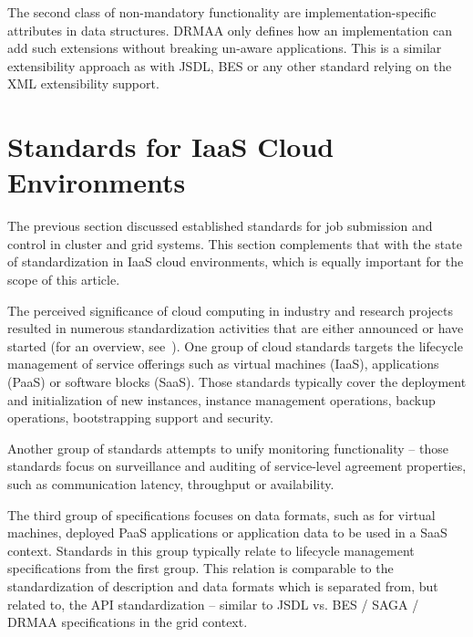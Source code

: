 \documentclass[twocolumn]{svjour3}       %
\begin{document}
The second class of non-mandatory functionality are implementation-specific attributes in data structures. DRMAA only defines how an implementation can add such extensions without breaking un-aware applications. This is a similar extensibility approach as with JSDL, BES or any other standard relying on the XML extensibility support. 


\section{Standards for IaaS Cloud Environments}
\label{sec:speciaas}

The previous section discussed established standards for job submission and control in cluster and grid systems.  This section complements that with the state of standardization in IaaS cloud environments, which is equally important for the scope of this article.  

The perceived significance of cloud computing in industry and research projects resulted in numerous standardization activities that are either announced or have started (for an overview, see~\cite{cloud_standards}).  One group of cloud standards targets the lifecycle management of service offerings such as virtual machines (IaaS), applications (PaaS) or software blocks (SaaS). Those standards typically cover the deployment and initialization of new instances, instance management operations, backup operations, bootstrapping support and security.

Another group of standards attempts to unify monitoring functionality -- those standards focus on surveillance and auditing of service-level agreement properties, such as communication latency, throughput or availability.

The third group of specifications focuses on data formats, such as for virtual machines, deployed PaaS applications or application data to be used in a SaaS context. Standards in this group typically relate to lifecycle management specifications from the first group. This relation is comparable to the standardization of description and data formats which is separated from, but related to, the API standardization -- similar to JSDL vs. BES / SAGA / DRMAA specifications in the grid context. 
\end{document}
